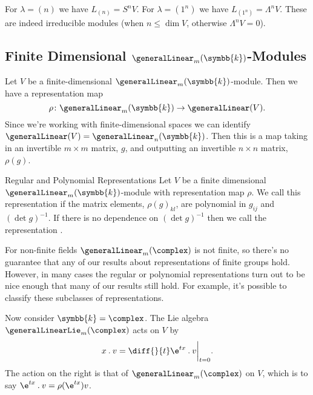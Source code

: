 \documentclass[fleqn]{NotesClass}
\renewcommand{\field}{\symbb{k}}
\newcommand{\action}{\mathbin{.}}
\begin{document}
    \begin{exm}{}{}
        For \(\lambda = (n)\) we have \(L_{(n)} = S^nV\).
        For \(\lambda = (1^n)\) we have \(L_{(1^n)} = \Lambda^nV\).
        These are indeed irreducible modules (when \(n \le \dim V\), otherwise \(\Lambda^nV = 0\)).
    \end{exm}
    
    \subsection{Finite Dimensional \texorpdfstring{\(\generalLinear_m(\field)\)}{GLm(k)}-Modules}
    Let \(V\) be a finite-dimensional \(\generalLinear_m(\field)\)-module.
    Then we have a representation map
    \begin{equation}
        \rho \colon \generalLinear_m(\field) \to \generalLinear(V).
    \end{equation}
    Since we're working with finite-dimensional spaces we can identify \(\generalLinear(V) = \generalLinear_n(\field)\).
    Then this is a map taking in an invertible \(m \times m\) matrix, \(g\), and outputting an invertible \(n \times n\) matrix, \(\rho(g)\).
    
    \begin{dfn}{Regular and Polynomial Representations}{}
        Let \(V\) be a finite dimensional \(\generalLinear_m(\field)\)-module with representation map \(\rho\).
        We call this representation  if the matrix elements, \(\rho(g)_{kl}\), are polynomial in \(g_{ij}\) and \((\det g)^{-1}\).
        If there is no dependence on \((\det g)^{-1}\) then we call the representation .
    \end{dfn}
    
    For non-finite fields \(\generalLinear_m(\complex)\) is not finite, so there's no guarantee that any of our results about representations of finite groups hold.
    However, in many cases the regular or polynomial representations turn out to be nice enough that many of our results still hold.
    For example, it's possible to classify these subclasses of representations.
    
    Now consider \(\field = \complex\).
    The Lie algebra \(\generalLinearLie_m(\complex)\) acts on \(V\) by
    \begin{equation}
        x \action v = \diff{}{t} \e^{tx} \action v \bigg|_{t = 0}.
    \end{equation}
    The action on the right is that of \(\generalLinear_m(\complex)\) on \(V\), which is to say \(\e^{tx} \action v = \rho(\e^{tx})v\).
    
\end{document}
